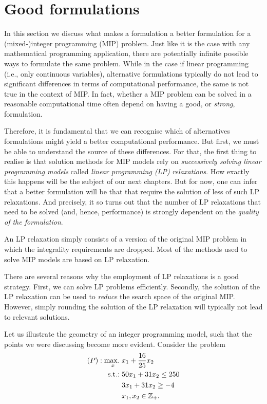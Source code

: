   
\section{Good formulations}

In this section we discuss what makes a formulation a better formulation for a (mixed-)integer programming (MIP) problem. Just like it is the case with any mathematical programming application, there are potentially infinite possible ways to formulate the same problem. While in the case if linear programming (i.e., only continuous variables), alternative formulations typically do not lead to significant differences in terms of computational performance, the same is not true in the context of MIP. In fact, whether a MIP problem can be solved in a reasonable computational time often depend on having a good, or \emph{strong}, formulation.

Therefore, it is fundamental that we can recognise which of alternatives formulations might yield a better computational performance. But first, we must be able to understand the source of these differences. For that, the first thing to realise is that solution methods for MIP models rely on \emph{successively solving linear programming models} called \emph{linear programming (LP) relaxations}. How exactly this happens will be the subject of our next chapters. But for now, one can infer that a better formulation will be that that require the solution of less of such LP relaxations. And precisely, it so turns out that the number of LP relaxations that need to be solved (and, hence, performance) is strongly dependent on the \emph{quality of the formulation}.

An LP relaxation simply consists of a version of the original MIP problem in which the integrality requirements are dropped. Most of the methods used to solve MIP models are based on LP relaxation. 

There are several reasons why the employment of LP relaxations is a good strategy. First, we can solve LP problems efficiently. Secondly, the solution of the LP relaxation can be used to \emph{reduce} the search space of the original MIP. However, simply rounding the solution of the LP relaxation will typically not lead to relevant solutions.

Let us illustrate the geometry of an integer programming model, such that the points we were discussing become more evident. Consider the problem
%
\begin{align*}
	(P): \mathop{\text{max.~}}_x &x_1 + \frac{16}{25}x_2 \\
	\mathop{\text{s.t.:~}} &50x_1 + 31x_2 \leq 250\\
	&3x_1 + 31x_2 \geq -4\\
	&x_1, x_2 \in \mathbb{Z}_+.
\end{align*}
 
